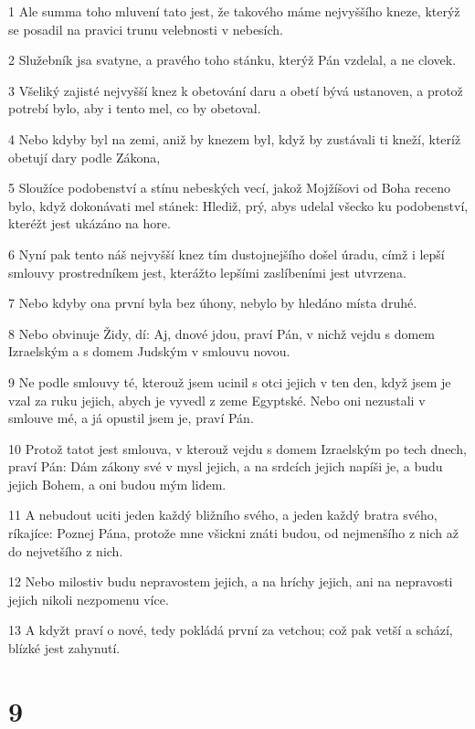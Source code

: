 \par 1 Ale summa toho mluvení tato jest, že takového máme nejvyššího kneze, kterýž se posadil na pravici trunu velebnosti v nebesích.
\par 2 Služebník jsa svatyne, a pravého toho stánku, kterýž Pán vzdelal, a ne clovek.
\par 3 Všeliký zajisté nejvyšší knez k obetování daru a obetí bývá ustanoven, a protož potrebí bylo, aby i tento mel, co by obetoval.
\par 4 Nebo kdyby byl na zemi, aniž by knezem byl, když by zustávali ti kneží, kteríž obetují dary podle Zákona,
\par 5 Sloužíce podobenství a stínu nebeských vecí, jakož Mojžíšovi od Boha receno bylo, když dokonávati mel stánek: Hlediž, prý, abys udelal všecko ku podobenství, kteréžt jest ukázáno na hore.
\par 6 Nyní pak tento náš nejvyšší knez tím dustojnejšího došel úradu, címž i lepší smlouvy prostredníkem jest, kterážto lepšími zaslíbeními jest utvrzena.
\par 7 Nebo kdyby ona první byla bez úhony, nebylo by hledáno místa druhé.
\par 8 Nebo obvinuje Židy, dí: Aj, dnové jdou, praví Pán, v nichž vejdu s domem Izraelským a s domem Judským v smlouvu novou.
\par 9 Ne podle smlouvy té, kterouž jsem ucinil s otci jejich v ten den, když jsem je vzal za ruku jejich, abych je vyvedl z zeme Egyptské. Nebo oni nezustali v smlouve mé, a já opustil jsem je, praví Pán.
\par 10 Protož tatot jest smlouva, v kterouž vejdu s domem Izraelským po tech dnech, praví Pán: Dám zákony své v mysl jejich, a na srdcích jejich napíši je, a budu jejich Bohem, a oni budou mým lidem.
\par 11 A nebudout uciti jeden každý bližního svého, a jeden každý bratra svého, ríkajíce: Poznej Pána, protože mne všickni znáti budou, od nejmenšího z nich až do nejvetšího z nich.
\par 12 Nebo milostiv budu nepravostem jejich, a na hríchy jejich, ani na nepravosti jejich nikoli nezpomenu více.
\par 13 A kdyžt praví o nové, tedy pokládá první za vetchou; což pak vetší a schází, blízké jest zahynutí.

\chapter{9}

